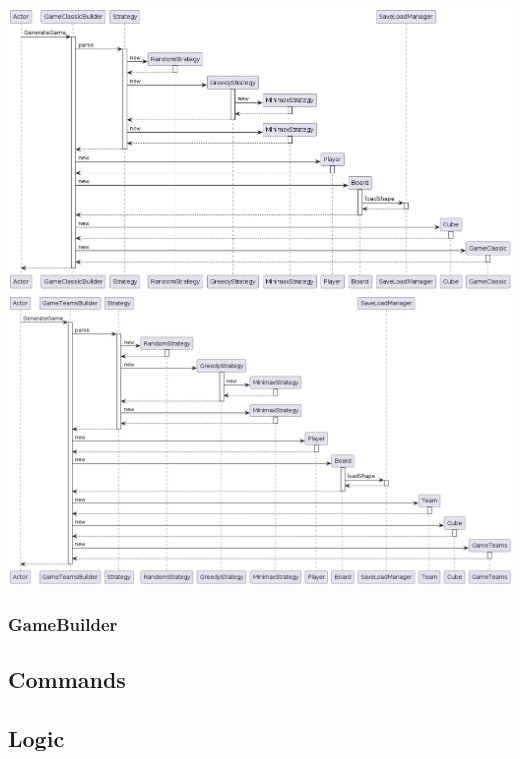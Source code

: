 \documentclass[12pt,a4paper,openright]{book}
\theoremstyle{break}
\begin{document}
\begin{center}
\includegraphics[scale=0.45]{GameClassicBuilder_final_seq}
\includegraphics[scale=0.45]{GameTeamsBuilder_final_seq}
\end{center}



\subsubsection{GameBuilder}
\subsection{Commands}

\newpage

\subsection{Logic}
\end{document}

